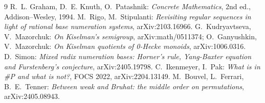 \documentclass[11pt]{article}
\theoremstyle{definition}
\theoremstyle{remark}
\begin{document}
\begin{thebibliography}{9}
 R.~L. Graham, D.~E. Knuth, O.~Patashnik:
\emph{Concrete Mathematics}, 2nd ed., Addison--Wesley, 1994.
 M.~Rigo, M.~Stipulanti: \emph{Revisiting regular
sequences in light of rational base numeration systems},
arXiv:2103.16966.
 G.~Kudryavtseva, V.~Mazorchuk: \emph{On
Kiselman's semigroup}, arXiv:math/0511374; O.~Ganyushkin,
V.~Mazorchuk: \emph{On Kiselman quotients of 0-Hecke monoids},
arXiv:1006.0316.
 D.~Simon: \emph{Mixed radix numeration bases:
Horner's rule, Yang-Baxter equation and Furstenberg's conjecture},
arXiv:2405.19798.
 C.~Ikenmeyer, I.~Pak: \emph{What is in \#P
and what is not?}, FOCS 2022, arXiv:2204.13149.
 M.~Bouvel, L.~Ferrari, B.~E.~Tenner:
\emph{Between weak and Bruhat: the middle order on permutations},
arXiv:2405.08943.
\end{thebibliography}
\end{document}
